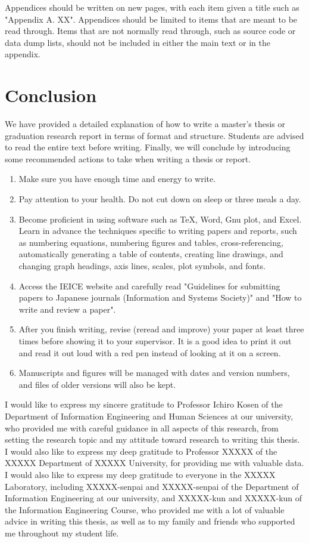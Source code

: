Appendices should be written on new pages, with each item given a title such as "Appendix A. XX". Appendices should be limited to items that are meant to be read through. Items that are not normally read through, such as source code or data dump lists, should not be included in either the main text or in the appendix.

\chapter{Conclusion}
We have provided a detailed explanation of how to write a master's thesis or graduation research report in terms of format and structure. Students are advised to read the entire text before writing. Finally, we will conclude by introducing some recommended actions to take when writing a thesis or report.

\begin{enumerate}
\item Make sure you have enough time and energy to write.
\item Pay attention to your health. Do not cut down on sleep or three meals a day.
\item Become proficient in using software such as \TeX, Word, Gnu plot, and Excel. Learn in advance the techniques specific to writing papers and reports, such as numbering equations, numbering figures and tables, cross-referencing, automatically generating a table of contents, creating line drawings, and changing graph headings, axis lines, scales, plot symbols, and fonts.
\item Access the IEICE website and carefully read "Guidelines for submitting papers to Japanese journals (Information and Systems Society)" and "How to write and review a paper".
\item After you finish writing, revise (reread and improve) your paper at least three times before showing it to your supervisor. It is a good idea to print it out and read it out loud with a red pen instead of looking at it on a screen.
\item Manuscripts and figures will be managed with dates and version numbers, and files of older versions will also be kept.
\end{enumerate}

\acknowledgement %
I would like to express my sincere gratitude to Professor Ichiro Kosen of the Department of Information Engineering and Human Sciences at our university, who provided me with careful guidance in all aspects of this research, from setting the research topic and my attitude toward research to writing this thesis. I would also like to express my deep gratitude to Professor XXXXX of the XXXXX Department of XXXXX University, for providing me with valuable data. I would also like to express my deep gratitude to everyone in the XXXXX Laboratory, including XXXXX-senpai and XXXXX-senpai of the Department of Information Engineering at our university, and XXXXX-kun and XXXXX-kun of the Information Engineering Course, who provided me with a lot of valuable advice in writing this thesis, as well as to my family and friends who supported me throughout my student life.

